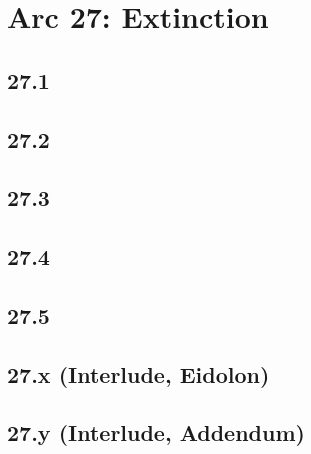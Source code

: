 \part*{Arc 27: Extinction}
 \chapter*{27.1}
 \chapter*{27.2}
 \chapter*{27.3}
 \chapter*{27.4}
 \chapter*{27.5}
 \chapter*{27.x (Interlude, Eidolon)}
 \chapter*{27.y (Interlude, Addendum)}








